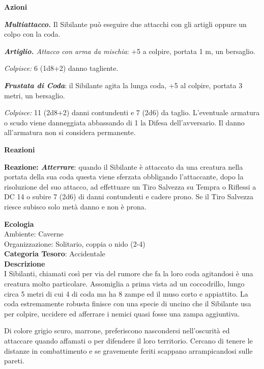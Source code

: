 \begin{multicols}{2}
{\textbf{Azioni}

\emph{\textbf{Multiattacco.}} Il Sibilante può eseguire due attacchi con gli artigli oppure un colpo con la coda.

\emph{\textbf{Artiglio.} Attacco con arma da mischia}: +5 a colpire, portata 1 m, un bersaglio.

\emph{Colpisce:} 6 (1d8+2) danno tagliente.

\emph{\textbf{Frustata di Coda}}: il Sibilante agita la lunga coda, +5 al colpire, portata 3 metri, un bersaglio.

\emph{Colpisce:} 11 (2d8+2) danni contundenti e 7 (2d6) da taglio. L'eventuale armatura o scudo viene danneggiata abbassando di 1 la Difesa dell'avversario. Il danno all'armatura non si considera permanente.

\textbf{Reazioni}

\textbf{Reazione: \emph{Atterrare}}: quando il Sibilante è attaccato da una creatura nella portata della sua coda questa viene sferzata obbligando l'attaccante, dopo la risoluzione del suo attacco, ad effettuare un Tiro Salvezza su Tempra o Riflessi a DC 14 o subire 7 (2d6) di danni contundenti e cadere prono. Se il Tiro Salvezza riesce subisco solo metà danno e non è prona.

\textbf{Ecologia}\\
Ambiente: Caverne\\
Organizzazione: Solitario, coppia o nido (2-4)\\
\textbf{Categoria Tesoro}: Accidentale\\
\textbf{Descrizione}\\
I Sibilanti, chiamati così per via del rumore che fa la loro coda agitandosi è una creatura molto particolare. Assomiglia a prima vista ad un coccodrillo, lungo circa 5 metri di cui 4 di coda ma ha 8 zampe ed il muso corto e appiattito. La coda estremamente robusta finisce con una specie di uncino che il Sibilante usa per colpire, uccidere ed afferrare i nemici quasi fosse una zampa aggiuntiva.

Di colore grigio scuro, marrone, preferiscono nascondersi nell'oscurità ed attaccare quando affamati o per difendere il loro territorio. Cercano di tenere le distanze in combattimento e se gravemente feriti scappano arrampicandosi sulle pareti.

}
\end{multicols}
